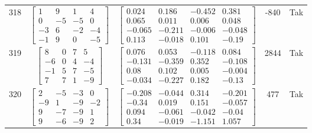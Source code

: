 \documentclass[a4paper,12pt]{article}
\begin{document}
\begin{tabular}{c c c c c}
318
&
$\begin{bmatrix} 1 & 9 & 1 & 4 \\ 0 & -5 & -5 & 0 \\ -3 & 6 & -2 & -4 \\ -1 & 9 & 0 & -5 \end{bmatrix}$
&
$\begin{bmatrix} 0.024 & 0.186 & -0.452 & 0.381 \\ 0.065 & 0.011 & 0.006 & 0.048 \\ -0.065 & -0.211 & -0.006 & -0.048 \\ 0.113 & -0.018 & 0.101 & -0.19 \end{bmatrix}$
&
-840
&
Tak
\\
319
&
$\begin{bmatrix} 8 & 0 & 7 & 5 \\ -6 & 0 & 4 & -4 \\ -1 & 5 & 7 & -5 \\ 7 & 7 & 1 & -9 \end{bmatrix}$
&
$\begin{bmatrix} 0.076 & 0.053 & -0.118 & 0.084 \\ -0.131 & -0.359 & 0.352 & -0.108 \\ 0.08 & 0.102 & 0.005 & -0.004 \\ -0.034 & -0.227 & 0.182 & -0.13 \end{bmatrix}$
&
2844
&
Tak
\\
320
&
$\begin{bmatrix} 2 & -5 & -3 & 0 \\ -9 & 1 & -9 & -2 \\ 9 & -7 & -9 & 1 \\ 9 & -6 & -9 & 2 \end{bmatrix}$
&
$\begin{bmatrix} -0.208 & -0.044 & 0.314 & -0.201 \\ -0.34 & 0.019 & 0.151 & -0.057 \\ 0.094 & -0.061 & -0.042 & -0.04 \\ 0.34 & -0.019 & -1.151 & 1.057 \end{bmatrix}$
&
477
&
Tak
\\
\end{tabular} \egroup \newpage
\end{document}
